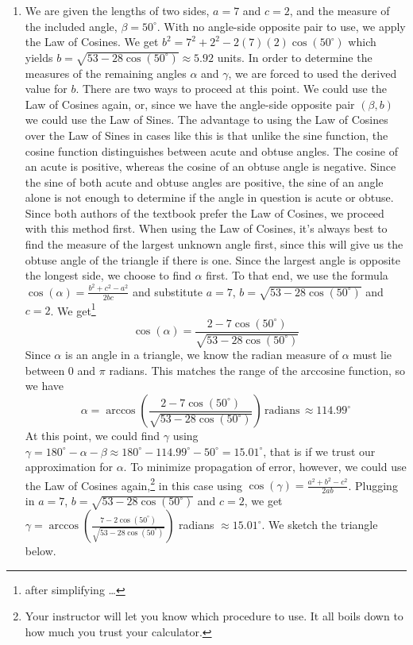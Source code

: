 \begin{ex}
\begin{enumerate}
\item  We are given the lengths of two sides, $a=7$ and $c = 2$, and the measure of the included angle, $\beta = 50^{\circ}$.  With no angle-side opposite pair to use, we apply  the Law of Cosines.  We get  $b^2 = 7^2 + 2^2 - 2(7)(2)\cos\left(50^{\circ}\right)$ which yields $b = \sqrt{53-28\cos\left(50^{\circ}\right)} \approx 5.92$ units.  In order to determine the measures of the remaining angles $\alpha$ and $\gamma$, we are forced to used the derived value for $b$. There are two ways to proceed at this point.  We could use the Law of Cosines again, or, since  we have the angle-side opposite pair $(\beta, b)$ we could use the Law of Sines. The advantage to using the Law of Cosines over the Law of Sines in cases like this is that unlike the sine function, the cosine function distinguishes between acute and obtuse angles.  The cosine of an acute is positive, whereas the cosine of an obtuse angle is negative.  Since the sine of both acute and obtuse angles are positive, the sine of an angle alone is not enough to determine if the angle in question is acute or obtuse.  Since both authors of the textbook prefer the Law of Cosines, we proceed with this method first.  When using the Law of Cosines, it's always best to find the measure of the largest unknown angle first, since this will give us the obtuse angle of the triangle if there is one.  Since the largest angle is opposite the longest side, we choose to find $\alpha$ first. To that end, we use the formula $\cos(\alpha) = \frac{b^2+c^2-a^2}{2bc}$ and substitute $a = 7$, $b =  \sqrt{53-28\cos\left(50^{\circ}\right)}$ and $c = 2$. We get\footnote{after simplifying \ldots} \[\cos(\alpha) = \frac{2-7\cos\left(50^{\circ}\right)}{\sqrt{53-28\cos\left(50^{\circ}\right)}}\]  Since $\alpha$ is an angle in a triangle, we know the radian measure of $\alpha$ must lie between $0$ and $\pi$ radians.  This matches the range of the arccosine function, so we have \[\alpha = \arccos\left(\frac{2-7\cos\left(50^{\circ}\right)}{\sqrt{53-28\cos\left(50^{\circ} \right)}}\right) \, \text{radians} \, \approx  114.99^{\circ}\] At this point, we could find $\gamma$ using $\gamma = 180^{\circ} - \alpha - \beta \approx 180^{\circ} - 114.99^{\circ} - 50^{\circ} = 15.01^{\circ}$, that is if we trust our approximation for $\alpha$. To minimize propagation of error, however, we could use the Law of Cosines again,\footnote{Your instructor will let you know which procedure to use. It all boils down to how much you trust your calculator.} in this case using $\cos(\gamma) = \frac{a^2+b^2-c^2}{2ab}$.  Plugging in $a = 7$, $b = \sqrt{53-28\cos\left(50^{\circ} \right)}$ and $c=2$, we get  $\gamma = \arccos\left(\frac{7-2 \cos\left(50^{\circ}\right)}{\sqrt{53-28\cos\left(50^{\circ} \right)}} \right)$ radians $\approx 15.01^{\circ}$.  We sketch the triangle below.


\end{enumerate}
\end{ex}
